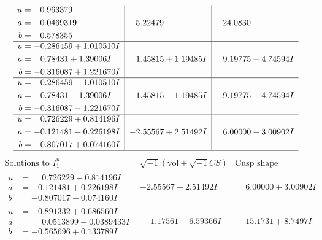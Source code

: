 \documentclass[1p]{elsarticle_modified}
\theoremstyle{definition}
\newcommand{\I}{\sqrt{-1}}
\begin{document}
$$\begin{array}{c|c|c}
\begin{aligned}
u &= \phantom{-}0.963379\phantom{ +0.000000I} \\
a &= -0.0469319\phantom{ +0.000000I} \\
b &= \phantom{-}0.578355\phantom{ +0.000000I}\end{aligned}
 & \phantom{-}5.22479\phantom{ +0.000000I} & \phantom{-}24.0830\phantom{ +0.000000I} \\ \hline\begin{aligned}
u &= -0.286459 + 1.010510 I \\
a &= \phantom{-}0.78431 + 1.39006 I \\
b &= -0.316087 + 1.221670 I\end{aligned}
 & \phantom{-}1.45815 + 1.19485 I & \phantom{-}9.19775 - 4.74594 I \\ \hline\begin{aligned}
u &= -0.286459 - 1.010510 I \\
a &= \phantom{-}0.78431 - 1.39006 I \\
b &= -0.316087 - 1.221670 I\end{aligned}
 & \phantom{-}1.45815 - 1.19485 I & \phantom{-}9.19775 + 4.74594 I \\ \hline\begin{aligned}
u &= \phantom{-}0.726229 + 0.814196 I \\
a &= -0.121481 - 0.226198 I \\
b &= -0.807017 + 0.074160 I\end{aligned}
 & -2.55567 + 2.51492 I & \phantom{-}6.00000 - 3.00902 I\\
 \hline 
 \end{array}$$\newpage$$\begin{array}{c|c|c}  
\text{Solutions to }I^u_{1}& \I (\text{vol} + \sqrt{-1}CS) & \text{Cusp shape}\\
 \hline 
\begin{aligned}
u &= \phantom{-}0.726229 - 0.814196 I \\
a &= -0.121481 + 0.226198 I \\
b &= -0.807017 - 0.074160 I\end{aligned}
 & -2.55567 - 2.51492 I & \phantom{-}6.00000 + 3.00902 I \\ \hline\begin{aligned}
u &= -0.891332 + 0.686560 I \\
a &= \phantom{-}0.0513899 - 0.0389433 I \\
b &= -0.565696 + 0.133789 I\end{aligned}
 & \phantom{-}1.17561 - 6.59366 I & \phantom{-}15.1731 + 8.7497 I \\ \hline\begin{aligned}

\end{aligned}
\end{array}$$
\end{document}
